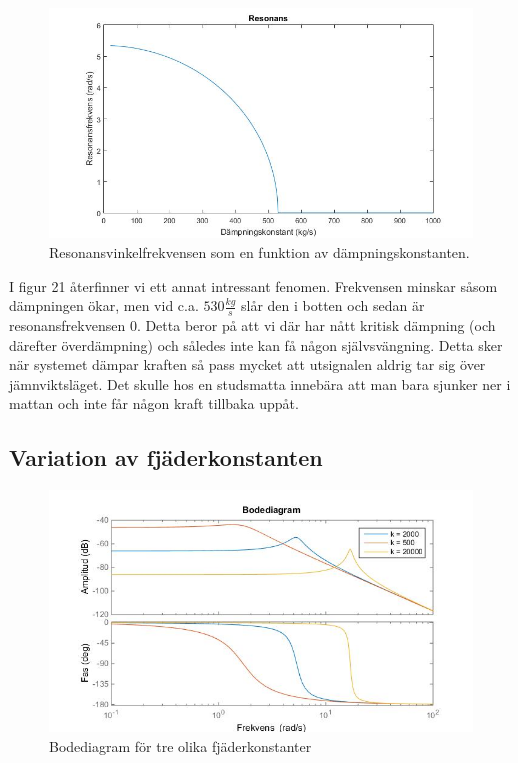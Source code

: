 \documentclass[10pt,a4paper]{article}
\begin{document}
\begin{figure}[h]
\begin{center}
\includegraphics[scale=0.4]{resonansDamp}
\caption{Resonansvinkelfrekvensen som en funktion av dämpningskonstanten.}
\end{center}
\end{figure}

I figur 21 återfinner vi ett annat intressant fenomen. Frekvensen minskar såsom dämpningen ökar, men vid c.a. $530\frac{kg}{s}$ slår den i botten och sedan är resonansfrekvensen $0$. Detta beror på att vi där har nått kritisk dämpning (och därefter överdämpning) och således inte kan få någon självsvängning. Detta sker när systemet dämpar kraften så pass mycket att utsignalen aldrig tar sig över jämnviktsläget. Det skulle hos en studsmatta innebära att man bara sjunker ner i mattan och inte får någon kraft tillbaka uppåt.

\subsection{Variation av fjäderkonstanten}


\begin{figure}[h]
\begin{center}
\includegraphics[scale=0.5]{Bode(fjader)}
\caption{Bodediagram för tre olika fjäderkonstanter}
\end{center}
\end{figure}
\end{document}
